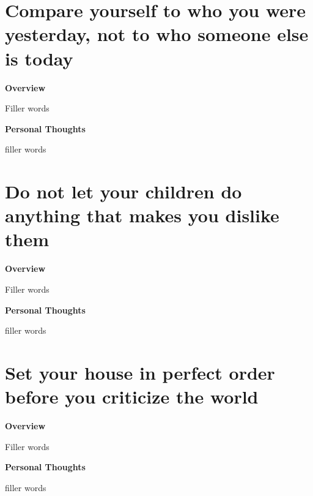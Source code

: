 \documentclass{article}
\begin{document}
\section{Compare yourself to who you were yesterday, not to who someone else is today}
    \begin{multicols}{2}
        \begin{center}
            \textbf{Overview}
        \end{center}
        
        Filler words 

        \begin{center}
            \textbf{Personal Thoughts}
        \end{center}
        
        filler words
        
    \end{multicols}

\section{Do not let your children do anything that makes you dislike them}
        \begin{multicols}{2}
        \begin{center}
            \textbf{Overview}
        \end{center}
        
        Filler words 

        \begin{center}
            \textbf{Personal Thoughts}
        \end{center}
        
        filler words
    \end{multicols}

\section{Set your house in perfect order before you criticize the world}
        \begin{multicols}{2}
        \begin{center}
            \textbf{Overview}
        \end{center}
        
        Filler words 

        \begin{center}
            \textbf{Personal Thoughts}
        \end{center}
        
        filler words
    \end{multicols}
    
\end{document}
